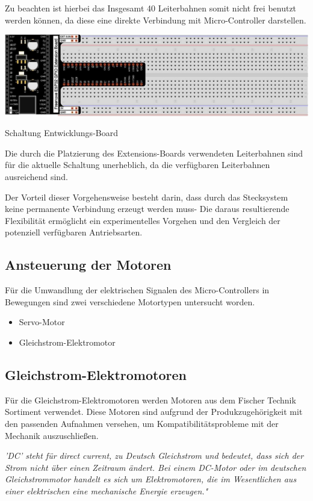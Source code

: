 \documentclass[conference,compsoc,final,a4paper]{IEEEtran}
\begin{document}
Zu beachten ist hierbei das Insgesamt 40 Leiterbahnen somit nicht frei benutzt werden können, da diese eine direkte Verbindung mit Micro-Controller darstellen.

\includegraphics{../images/ext_board.png}
\caption{Schaltung Entwicklungs-Board}
\label{Elektrik:DevBoardInternal}

Die durch die Platzierung des Extensions-Boards verwendeten Leiterbahnen sind für die aktuelle Schaltung unerheblich, da die verfügbaren Leiterbahnen ausreichend sind.

Der Vorteil dieser Vorgehensweise besteht darin, dass durch das Stecksystem keine permanente Verbindung erzeugt werden muss- Die daraus resultierende Flexibilität ermöglicht ein experimentelles Vorgehen und den Vergleich der potenziell verfügbaren Antriebsarten.

\subsection{Ansteuerung der Motoren}

Für die Umwandlung der elektrischen Signalen des Micro-Controllers in Bewegungen sind zwei verschiedene Motortypen untersucht worden.

\begin{itemize}
	\item Servo-Motor
	\item Gleichstrom-Elektromotor
\end{itemize}

\subsection{Gleichstrom-Elektromotoren}

Für die Gleichstrom-Elektromotoren werden Motoren aus dem Fischer Technik Sortiment verwendet. Diese Motoren sind aufgrund der Produkzugehörigkeit mit den passenden Aufnahmen versehen, um Kompatibilitätsprobleme mit der Mechanik auszuschließen.

\textit{’DC’ steht für direct current, zu Deutsch Gleichstrom und bedeutet, dass sich der Strom nicht über einen Zeitraum ändert. Bei einem DC-Motor oder im deutschen Gleichstrommotor handelt es sich um Elektromotoren, die im Wesentlichen aus
einer elektrischen eine mechanische Energie erzeugen." } \autocite{metzgerkonzepte}
\end{document}
